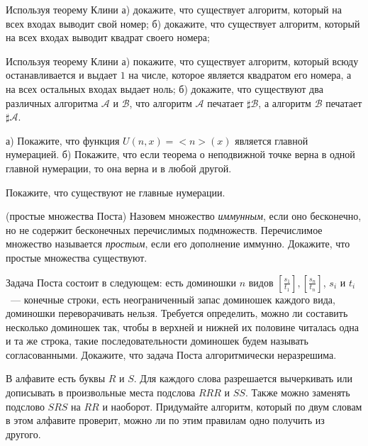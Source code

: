\setcounter{curtask}{23}


\newcommand{\dom}[2]{\left[\frac{#1}{#2}\right]}


\begin{task}
    Используя теорему Клини а) докажите, что существует алгоритм, который на всех входах выводит свой номер;
    б) докажите, что существует алгоритм, который на всех входах выводит квадрат своего номера;
\end{task}

\begin{task}
    Используя теорему Клини а) покажите, что существует алгоритм, который всюду останавливается и выдает $1$ на числе, которое
    является квадратом его номера, а на всех остальных входах выдает ноль; б) докажите, что существуют два различных алгоритма
    $\mathcal{A}$ и $\mathcal{B}$, что алгоритм $\mathcal{A}$ печатает $\sharp \mathcal{B}$, а алгоритм $\mathcal{B}$ печатает
    $\sharp \mathcal{A}$. 
\end{task}

\begin{task}
   а) Покажите, что функция $U(n,x)= {<}n{>}(x)$ является главной нумерацией. б) Покажите, что если теорема о неподвижной точке
   верна в одной главной нумерации, то она верна и в любой другой.
\end{task}

\begin{task}
   Покажите, что существуют не главные нумерации.
\end{task}


\breakline

\begin{ptask}{18} (простые множества Поста)
    Назовем множество {\it иммунным}, если оно бесконечно, но не содержит бесконечных перечислимых подмножеств. Перечислимое
    множество называется {\it простым}, если его дополнение иммунно. Докажите, что простые множества существуют.
\end{ptask}

\begin{ptask}{21}
	Задача Поста состоит в следующем: есть доминошки $n$ видов $\dom{s_1}{t_1}, \dom{s_n}{t_n}$, $s_i$ и $t_i$~--- конечные
    строки, есть неограниченный запас доминошек каждого вида, доминошки переворачивать нельзя. Требуется определить, можно ли
    составить несколько доминошек так, чтобы в верхней и нижней их половине читалась одна и та же строка, такие последовательности
    доминошек будем называть согласованными. Докажите, что задача Поста алгоритмически неразрешима.
\end{ptask}

\begin{ptask}{22}
	В алфавите есть буквы $R$ и $S$. Для каждого слова разрешается вычеркивать или дописывать в произвольные места подслова $RRR$
    и $SS$. Также можно заменять подслово $SRS$ на $RR$ и наоборот. Придумайте алгоритм, который по двум словам в этом алфавите
    проверит, можно ли по этим правилам одно получить из другого.
\end{ptask}